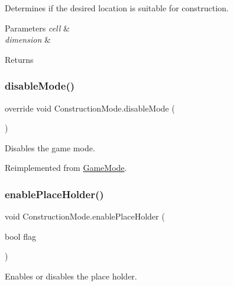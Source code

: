 Determines if the desired location is suitable for construction. 


\begin{DoxyParams}{Parameters}
{\em cell} & \\
\hline
{\em dimension} & \\
\hline
\end{DoxyParams}
\begin{DoxyReturn}{Returns}

\end{DoxyReturn}
\mbox{\label{class_construction_mode_a4229d5bd9df34fd90758404acd3b9cc8}} 
\subsubsection{\texorpdfstring{disable\+Mode()}{disableMode()}}
{\footnotesize\ttfamily override void Construction\+Mode.\+disable\+Mode (\begin{DoxyParamCaption}{ }\end{DoxyParamCaption})\hspace{0.3cm}{\ttfamily [virtual]}}



Disables the game mode. 



Reimplemented from \mbox{\hyperlink{class_game_mode_a5aea49bdae2459b78e1972dd0a34918e}{Game\+Mode}}.

\mbox{\label{class_construction_mode_a1bbac325b59030aeaae9a5ee5386f5a3}} 
\subsubsection{\texorpdfstring{enable\+Place\+Holder()}{enablePlaceHolder()}}
{\footnotesize\ttfamily void Construction\+Mode.\+enable\+Place\+Holder (\begin{DoxyParamCaption}\item[{bool}]{flag }\end{DoxyParamCaption})}



Enables or disables the place holder. 


